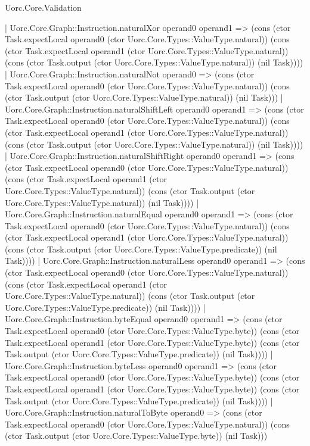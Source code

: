 \begin{lexlean}{Uorc.Core.Validation}
\begin{semanticmodule}
{    | Uorc.Core.Graph::Instruction.naturalXor operand0 operand1 => (cons (ctor Task.expectLocal operand0 (ctor Uorc.Core.Types::ValueType.natural)) (cons (ctor Task.expectLocal operand1 (ctor Uorc.Core.Types::ValueType.natural)) (cons (ctor Task.output (ctor Uorc.Core.Types::ValueType.natural)) (nil Task))))
    | Uorc.Core.Graph::Instruction.naturalNot operand0 => (cons (ctor Task.expectLocal operand0 (ctor Uorc.Core.Types::ValueType.natural)) (cons (ctor Task.output (ctor Uorc.Core.Types::ValueType.natural)) (nil Task)))
    | Uorc.Core.Graph::Instruction.naturalShiftLeft operand0 operand1 => (cons (ctor Task.expectLocal operand0 (ctor Uorc.Core.Types::ValueType.natural)) (cons (ctor Task.expectLocal operand1 (ctor Uorc.Core.Types::ValueType.natural)) (cons (ctor Task.output (ctor Uorc.Core.Types::ValueType.natural)) (nil Task))))
    | Uorc.Core.Graph::Instruction.naturalShiftRight operand0 operand1 => (cons (ctor Task.expectLocal operand0 (ctor Uorc.Core.Types::ValueType.natural)) (cons (ctor Task.expectLocal operand1 (ctor Uorc.Core.Types::ValueType.natural)) (cons (ctor Task.output (ctor Uorc.Core.Types::ValueType.natural)) (nil Task))))
    | Uorc.Core.Graph::Instruction.naturalEqual operand0 operand1 => (cons (ctor Task.expectLocal operand0 (ctor Uorc.Core.Types::ValueType.natural)) (cons (ctor Task.expectLocal operand1 (ctor Uorc.Core.Types::ValueType.natural)) (cons (ctor Task.output (ctor Uorc.Core.Types::ValueType.predicate)) (nil Task))))
    | Uorc.Core.Graph::Instruction.naturalLess operand0 operand1 => (cons (ctor Task.expectLocal operand0 (ctor Uorc.Core.Types::ValueType.natural)) (cons (ctor Task.expectLocal operand1 (ctor Uorc.Core.Types::ValueType.natural)) (cons (ctor Task.output (ctor Uorc.Core.Types::ValueType.predicate)) (nil Task))))
    | Uorc.Core.Graph::Instruction.byteEqual operand0 operand1 => (cons (ctor Task.expectLocal operand0 (ctor Uorc.Core.Types::ValueType.byte)) (cons (ctor Task.expectLocal operand1 (ctor Uorc.Core.Types::ValueType.byte)) (cons (ctor Task.output (ctor Uorc.Core.Types::ValueType.predicate)) (nil Task))))
    | Uorc.Core.Graph::Instruction.byteLess operand0 operand1 => (cons (ctor Task.expectLocal operand0 (ctor Uorc.Core.Types::ValueType.byte)) (cons (ctor Task.expectLocal operand1 (ctor Uorc.Core.Types::ValueType.byte)) (cons (ctor Task.output (ctor Uorc.Core.Types::ValueType.predicate)) (nil Task))))
    | Uorc.Core.Graph::Instruction.naturalToByte operand0 => (cons (ctor Task.expectLocal operand0 (ctor Uorc.Core.Types::ValueType.natural)) (cons (ctor Task.output (ctor Uorc.Core.Types::ValueType.byte)) (nil Task)))
}
\end{semanticmodule}
\end{lexlean}
